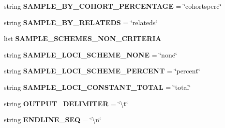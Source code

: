 \begin{DoxyCompactItemize}
\item 
string {\bfseries S\+A\+M\+P\+L\+E\+\_\+\+B\+Y\+\_\+\+C\+O\+H\+O\+R\+T\+\_\+\+P\+E\+R\+C\+E\+N\+T\+A\+GE} = \char`\"{}cohortsperc\char`\"{}\hypertarget{namespacenegui_1_1pgdriveneestimator_abf385f828ea73fe77218cc695ed31ca6}{}\label{namespacenegui_1_1pgdriveneestimator_abf385f828ea73fe77218cc695ed31ca6}

\item 
string {\bfseries S\+A\+M\+P\+L\+E\+\_\+\+B\+Y\+\_\+\+R\+E\+L\+A\+T\+E\+DS} = \char`\"{}relateds\char`\"{}\hypertarget{namespacenegui_1_1pgdriveneestimator_a5867272ead84c59e21ac0db9bf0a08f7}{}\label{namespacenegui_1_1pgdriveneestimator_a5867272ead84c59e21ac0db9bf0a08f7}

\item 
list {\bfseries S\+A\+M\+P\+L\+E\+\_\+\+S\+C\+H\+E\+M\+E\+S\+\_\+\+N\+O\+N\+\_\+\+C\+R\+I\+T\+E\+R\+IA}
\item 
string {\bfseries S\+A\+M\+P\+L\+E\+\_\+\+L\+O\+C\+I\+\_\+\+S\+C\+H\+E\+M\+E\+\_\+\+N\+O\+NE} = \char`\"{}none\char`\"{}\hypertarget{namespacenegui_1_1pgdriveneestimator_a8dfd8edb967f95bb041e347135a33547}{}\label{namespacenegui_1_1pgdriveneestimator_a8dfd8edb967f95bb041e347135a33547}

\item 
string {\bfseries S\+A\+M\+P\+L\+E\+\_\+\+L\+O\+C\+I\+\_\+\+S\+C\+H\+E\+M\+E\+\_\+\+P\+E\+R\+C\+E\+NT} = \char`\"{}percent\char`\"{}\hypertarget{namespacenegui_1_1pgdriveneestimator_a142c5458e517f1c3bcfcc990b04bb025}{}\label{namespacenegui_1_1pgdriveneestimator_a142c5458e517f1c3bcfcc990b04bb025}

\item 
string {\bfseries S\+A\+M\+P\+L\+E\+\_\+\+L\+O\+C\+I\+\_\+\+C\+O\+N\+S\+T\+A\+N\+T\+\_\+\+T\+O\+T\+AL} = \char`\"{}total\char`\"{}\hypertarget{namespacenegui_1_1pgdriveneestimator_af0086ffbe3400aa8ef6234dd375701bd}{}\label{namespacenegui_1_1pgdriveneestimator_af0086ffbe3400aa8ef6234dd375701bd}

\item 
string {\bfseries O\+U\+T\+P\+U\+T\+\_\+\+D\+E\+L\+I\+M\+I\+T\+ER} = \char`\"{}\textbackslash{}t\char`\"{}\hypertarget{namespacenegui_1_1pgdriveneestimator_abcd9551489a7ca0281f03b3b0236e8e2}{}\label{namespacenegui_1_1pgdriveneestimator_abcd9551489a7ca0281f03b3b0236e8e2}

\item 
string {\bfseries E\+N\+D\+L\+I\+N\+E\+\_\+\+S\+EQ} = \char`\"{}\textbackslash{}n\char`\"{}\hypertarget{namespacenegui_1_1pgdriveneestimator_a5de353f2cfacdd1ffb10c1eae6ccdd8c}{}\label{namespacenegui_1_1pgdriveneestimator_a5de353f2cfacdd1ffb10c1eae6ccdd8c}


\end{DoxyCompactItemize}
